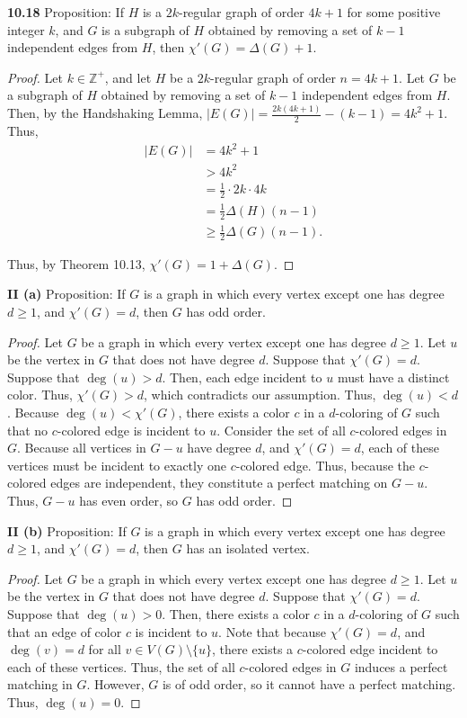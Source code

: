 \documentclass[12pt]{article}
\begin{document}
\medskip\noindent\textbf{10.18} Proposition: If $H$ is a $2k$-regular graph of order $4k+1$ for some positive integer $k$, and $G$ is a subgraph of $H$ obtained by removing a set of $k-1$ independent edges from $H$, then $\chi'(G) = \Delta(G) + 1$.
\begin{proof}
    Let $k \in \mathbb Z^+$, and let $H$ be a $2k$-regular graph of order $n = 4k+1$.
    Let $G$ be a subgraph of $H$ obtained by removing a set of $k-1$ independent edges from $H$.
    Then, by the Handshaking Lemma, $|E(G)| = \frac{2k(4k+1)}{2} - (k-1) = 4k^2 + 1$.
    Thus,
    \begin{align*}
        |E(G)| &= 4k^2 + 1 \\
        &> 4k^2 \\
        &= \frac12 \cdot 2k \cdot 4k \\
        &= \frac12 \Delta(H) (n - 1) \\
        &\geq \frac12\Delta(G)(n-1).
    \end{align*}

    Thus, by Theorem 10.13, $\chi'(G) = 1 + \Delta(G)$.
\end{proof}

\medskip\noindent\textbf{II (a)} Proposition: If $G$ is a graph in which every vertex except one has degree $d \geq 1$, and $\chi'(G) = d$, then $G$ has odd order.
\begin{proof}
    Let $G$ be a graph in which every vertex except one has degree $d \geq 1$.
    Let $u$ be the vertex in $G$ that does not have degree $d$.
    Suppose that $\chi'(G) = d$.
    Suppose that $\deg(u) > d$.
    Then, each edge incident to $u$ must have a distinct color.
    Thus, $\chi'(G) > d$, which contradicts our assumption.
    Thus, $\deg(u) < d$.
    Because $\deg(u) < \chi'(G)$, there exists a color $c$ in a $d$-coloring of $G$ such that no $c$-colored edge is incident to $u$.
    Consider the set of all $c$-colored edges in $G$.
    Because all vertices in $G - u$ have degree $d$, and $\chi'(G) = d$, each of these vertices must be incident to exactly one $c$-colored edge.
    Thus, because the $c$-colored edges are independent, they constitute a perfect matching on $G-u$.
    Thus, $G-u$ has even order, so $G$ has odd order.
\end{proof}

\medskip\noindent\textbf{II (b)} Proposition: If $G$ is a graph in which every vertex except one has degree $d \geq 1$, and $\chi'(G) = d$, then $G$ has an isolated vertex.
\begin{proof}
    Let $G$ be a graph in which every vertex except one has degree $d \geq 1$.
    Let $u$ be the vertex in $G$ that does not have degree $d$.
    Suppose that $\chi'(G) = d$.
    Suppose that $\deg(u) > 0$.
    Then, there exists a color $c$ in a $d$-coloring of $G$ such that an edge of color $c$ is incident to $u$.
    Note that because $\chi'(G) = d$, and $\deg(v) = d$ for all $v \in V(G) \setminus \{u\}$, there exists a $c$-colored edge incident to each of these vertices.
    Thus, the set of all $c$-colored edges in $G$ induces a perfect matching in $G$.
    However, $G$ is of odd order, so it cannot have a perfect matching.
    Thus, $\deg(u) = 0$.
\end{proof}
\end{document}
